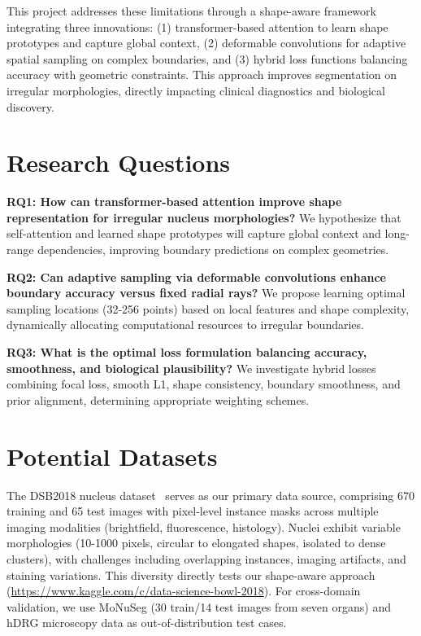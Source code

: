 \documentclass[acmlarge]{acmart}
\begin{document}
This project addresses these limitations through a shape-aware framework integrating three innovations: (1) transformer-based attention to learn shape prototypes and capture global context, (2) deformable convolutions for adaptive spatial sampling on complex boundaries, and (3) hybrid loss functions balancing accuracy with geometric constraints. This approach improves segmentation on irregular morphologies, directly impacting clinical diagnostics and biological discovery.

\section{Research Questions}

\textbf{RQ1: How can transformer-based attention improve shape representation for irregular nucleus morphologies?} We hypothesize that self-attention and learned shape prototypes will capture global context and long-range dependencies, improving boundary predictions on complex geometries.

\textbf{RQ2: Can adaptive sampling via deformable convolutions enhance boundary accuracy versus fixed radial rays?} We propose learning optimal sampling locations (32-256 points) based on local features and shape complexity, dynamically allocating computational resources to irregular boundaries.

\textbf{RQ3: What is the optimal loss formulation balancing accuracy, smoothness, and biological plausibility?} We investigate hybrid losses combining focal loss, smooth L1, shape consistency, boundary smoothness, and prior alignment, determining appropriate weighting schemes.

\section{Potential Datasets}

The DSB2018 nucleus dataset~\cite{caicedo2019nucleus} serves as our primary data source, comprising 670 training and 65 test images with pixel-level instance masks across multiple imaging modalities (brightfield, fluorescence, histology). Nuclei exhibit variable morphologies (10-1000 pixels, circular to elongated shapes, isolated to dense clusters), with challenges including overlapping instances, imaging artifacts, and staining variations. This diversity directly tests our shape-aware approach (\url{https://www.kaggle.com/c/data-science-bowl-2018}). For cross-domain validation, we use MoNuSeg (30 train/14 test images from seven organs) and hDRG microscopy data as out-of-distribution test cases.
\end{document}
